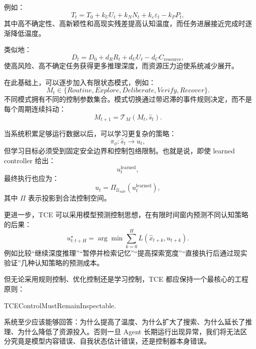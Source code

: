 例如：
\begin{equation}
    T_t
    =
    T_0
    +
    k_UU_t
    +
    k_NN_t
    +
    k_\varepsilon\varepsilon_t
    -
    k_PP_t,
\end{equation}
其中高不确定性、高新颖性和高现实残差提高认知温度，而任务进展接近完成时逐渐降低温度。

类似地：
\begin{equation}
    D_t
    =
    D_0
    +
    d_RR_t
    +
    d_UU_t
    -
    d_CC_{\mathrm{resource}},
\end{equation}
使高风险、高不确定任务获得更多推理深度，而资源压力迫使系统减少展开。

在此基础上，可以逐步加入有限状态模式，例如：
\begin{equation}
    M_t
    \in
    \{
    Routine,
    Explore,
    Deliberate,
    Verify,
    Recover
    \}.
\end{equation}
不同模式拥有不同的控制参数集合。模式切换通过带迟滞的事件规则决定，而不是每个周期连续抖动：
\begin{equation}
    M_{t+1}
    =
    \mathcal T_M(M_t,\hat s_t).
\end{equation}

当系统积累足够运行数据以后，可以学习更复杂的策略：
\begin{equation}
    \pi_\phi:
    \hat s_t
    \rightarrow
    u_t,
\end{equation}
但学习目标必须受到固定安全边界和控制包络限制。也就是说，即使 learned controller 给出：
\begin{equation}
    u^\mathrm{learned}_t,
\end{equation}
最终执行也应为：
\begin{equation}
    u_t
    =
    \Pi_{\mathcal U_{\mathrm{safe}}}
    \left(
    u^\mathrm{learned}_t
    \right),
\end{equation}
其中 $\Pi$ 表示投影到合法控制空间。

更进一步，TCE 可以采用模型预测控制思想，在有限时间窗内预测不同认知策略的后果：
\begin{equation}
    u_{t:t+H}^\star
    =
    \arg\min
    \sum_{k=0}^{H}
    L(
    \hat x_{t+k},
    u_{t+k}
    ).
\end{equation}
例如比较“继续深度推理”“暂停并检索记忆”“提高探索宽度”“直接执行后通过现实验证”几种认知策略的预测成本。

但无论采用规则控制、优化控制还是学习控制，TCE 都应保持一个最核心的工程原则：
\begin{statementbox}
TCEControlMustRemainInspectable.
\end{statementbox}
系统至少应该能够回答：为什么提高了温度、为什么扩大了搜索、为什么延长了推理、为什么降低了资源投入。否则一旦 Agent 长期运行出现异常，我们将无法区分究竟是模型内容错误、自我状态估计错误，还是控制器本身错误。

